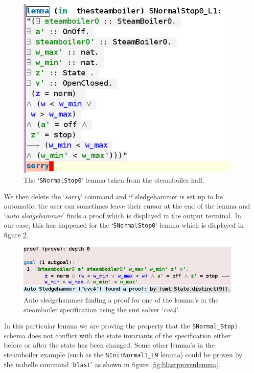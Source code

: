 \begin{figure}[H]
\centering
\includegraphics[scale=0.5]{Figures/Evaluation/sorryoutputlemma.png}
\caption{The `\texttt{SNormalStop0}' lemma taken from the steamboiler \gls{half}. \label{fig:steamboilerL1lemma}}
\end{figure}

We then delete the `\emph{sorry}' command and if sledgehammer is set up to be automatic, the user can sometimes leave their cursor at the end of the lemma and `\emph{auto sledgehammer}' finds a proof which is displayed in the output terminal. In our case, this has happened for the `\texttt{SNormalStop0}' lemma which is displayed in figure \ref{fig:autosolvelemma}.

\begin{figure}[H]
\centering
\includegraphics[scale=0.5]{Figures/Evaluation/steamboilerlemmaproof.png}
\caption{Auto sledgehammer finding a proof for one of the lemma's in the steamboiler specification using the \gls{smt} solver `\emph{cvc4}'. \label{fig:autosolvelemma}}
\end{figure}

In this particular lemma we are proving the property that the \verb|SNormal_Stop)| schema does not conflict with the state invariants of the specification either before or after the state has been changed. Some other lemma's in the steamboiler example (such as the \verb|SInitNormal1_L9| lemma) could be proven by the isabelle command `\texttt{blast}' as shown in figure \ref{fig:blastprovenlemma}. 

